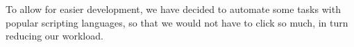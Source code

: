 To allow for easier development, we have decided to automate some tasks with popular scripting languages, so that we would not have to click so much, in turn reducing our workload.